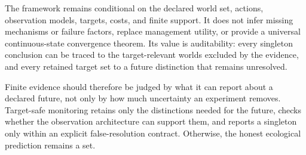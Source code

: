 \documentclass[11pt]{article}
\begin{document}
The framework remains conditional on the declared world set, actions, observation models, targets, costs, and finite support. It does not infer missing mechanisms or failure factors, replace management utility, or provide a universal continuous-state convergence theorem. Its value is auditability: every singleton conclusion can be traced to the target-relevant worlds excluded by the evidence, and every retained target set to a future distinction that remains unresolved.

Finite evidence should therefore be judged by what it can report about a declared future, not only by how much uncertainty an experiment removes. Target-safe monitoring retains only the distinctions needed for the future, checks whether the observation architecture can support them, and reports a singleton only within an explicit false-resolution contract. Otherwise, the honest ecological prediction remains a set.
\end{document}
